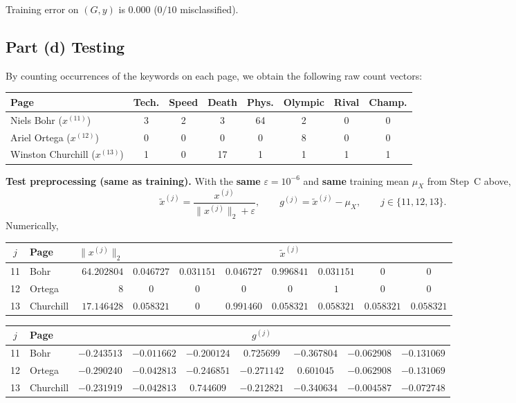 \documentclass[fleqn]{article}
\begin{document}
    Training error on $(G,y)$ is $0.000$ ($0/10$ misclassified).

    \subsection{Part (d) Testing}
    By counting occurrences of the keywords on each page, we obtain the following raw count vectors:
    \begin{center}
    \begin{tabular}{l|ccccccc}
        \hline
        Page & Tech. & Speed & Death & Phys. & Olympic & Rival & Champ. \\
        \hline
        Niels Bohr ($x^{(11)}$) & 3 & 2 & 3 & 64 & 2 & 0 & 0 \\
        Ariel Ortega ($x^{(12)}$) & 0 & 0 & 0 & 0 & 8 & 0 & 0 \\
        Winston Churchill ($x^{(13)}$) & 1 & 0 & 17 & 1 & 1 & 1 & 1 \\
        \hline
    \end{tabular}
    \end{center}

    \medskip
    \noindent\textbf{Test preprocessing (same as training).}
    With the \textbf{same} $\varepsilon=10^{-6}$ and \textbf{same} training mean $\mu_X$ from Step~C above,
    \[
        \tilde{x}^{(j)}=\frac{x^{(j)}}{\|x^{(j)}\|_2+\varepsilon},\qquad
        g^{(j)}=\tilde{x}^{(j)}-\mu_X,\qquad j\in\{11,12,13\}.
    \]
    Numerically,
    \begin{center}
    {\footnotesize
    \begin{tabular}{c|l|r|ccccccc}
        $j$ & Page & $\|x^{(j)}\|_2$ & \multicolumn{7}{c}{$\tilde{x}^{(j)}$} \\
        \hline
        11 & Bohr & $64.202804$ &
        $0.046727$ & $0.031151$ & $0.046727$ & $0.996841$ & $0.031151$ & $0$ & $0$ \\
        12 & Ortega & $8$ &
        $0$ & $0$ & $0$ & $0$ & $1$ & $0$ & $0$ \\
        13 & Churchill & $17.146428$ &
        $0.058321$ & $0$ & $0.991460$ & $0.058321$ & $0.058321$ & $0.058321$ & $0.058321$ \\
        \hline
    \end{tabular}
    }
    \end{center}
    \begin{center}
    {\footnotesize
    \begin{tabular}{c|l|ccccccc}
        $j$ & Page & \multicolumn{7}{c}{$g^{(j)}$} \\
        \hline
        11 & Bohr &
        $-0.243513$ & $-0.011662$ & $-0.200124$ & $0.725699$ & $-0.367804$ & $-0.062908$ & $-0.131069$ \\
        12 & Ortega &
        $-0.290240$ & $-0.042813$ & $-0.246851$ & $-0.271142$ & $0.601045$ & $-0.062908$ & $-0.131069$ \\
        13 & Churchill &
        $-0.231919$ & $-0.042813$ & $0.744609$ & $-0.212821$ & $-0.340634$ & $-0.004587$ & $-0.072748$ \\
        \hline
    \end{tabular}
    }
    \end{center}
\end{document}
